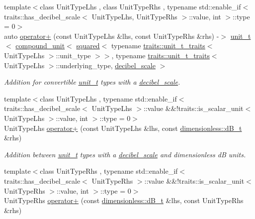 \begin{DoxyCompactItemize}
\item 
\hypertarget{namespaceunits_a488c7b98d0a88d36d584354ed7de0c09}{}{\footnotesize template$<$class Unit\+Type\+Lhs , class Unit\+Type\+Rhs , typename std\+::enable\+\_\+if$<$ traits\+::has\+\_\+decibel\+\_\+scale$<$ Unit\+Type\+Lhs, Unit\+Type\+Rhs $>$\+::value, int $>$\+::type  = 0$>$ }\\auto \hyperlink{namespaceunits_a488c7b98d0a88d36d584354ed7de0c09}{operator+} (const Unit\+Type\+Lhs \&lhs, const Unit\+Type\+Rhs \&rhs) -\/$>$ \hyperlink{classunits_1_1unit__t}{unit\+\_\+t}$<$ \hyperlink{group___unit_types_ga9c3f6f077dc894620e1ed8358442a8f1}{compound\+\_\+unit}$<$ \hyperlink{group___unit_manipulators_ga636346f7898c35eb98a796bec1d77fb2}{squared}$<$ typename \hyperlink{structunits_1_1traits_1_1unit__t__traits}{traits\+::unit\+\_\+t\+\_\+traits}$<$ Unit\+Type\+Lhs $>$\+::unit\+\_\+type $>$$>$, typename \hyperlink{structunits_1_1traits_1_1unit__t__traits}{traits\+::unit\+\_\+t\+\_\+traits}$<$ Unit\+Type\+Lhs $>$\+::underlying\+\_\+type, \hyperlink{structunits_1_1decibel__scale}{decibel\+\_\+scale} $>$\label{namespaceunits_a488c7b98d0a88d36d584354ed7de0c09}

\begin{DoxyCompactList}\small\item\em Addition for convertible \hyperlink{classunits_1_1unit__t}{unit\+\_\+t} types with a \hyperlink{structunits_1_1decibel__scale}{decibel\+\_\+scale}. \end{DoxyCompactList}\item 
\hypertarget{namespaceunits_adf06dd60e06ef1eed7a1bb57cb548ecb}{}{\footnotesize template$<$class Unit\+Type\+Lhs , typename std\+::enable\+\_\+if$<$ traits\+::has\+\_\+decibel\+\_\+scale$<$ Unit\+Type\+Lhs $>$\+::value \&\&!traits\+::is\+\_\+scalar\+\_\+unit$<$ Unit\+Type\+Lhs $>$\+::value, int $>$\+::type  = 0$>$ }\\Unit\+Type\+Lhs \hyperlink{namespaceunits_adf06dd60e06ef1eed7a1bb57cb548ecb}{operator+} (const Unit\+Type\+Lhs \&lhs, const \hyperlink{classunits_1_1unit__t}{dimensionless\+::d\+B\+\_\+t} \&rhs)\label{namespaceunits_adf06dd60e06ef1eed7a1bb57cb548ecb}

\begin{DoxyCompactList}\small\item\em Addition between \hyperlink{classunits_1_1unit__t}{unit\+\_\+t} types with a \hyperlink{structunits_1_1decibel__scale}{decibel\+\_\+scale} and dimensionless d\+B units. \end{DoxyCompactList}\item 
\hypertarget{namespaceunits_ae865c6df51af18fed561ca9b3c270202}{}{\footnotesize template$<$class Unit\+Type\+Rhs , typename std\+::enable\+\_\+if$<$ traits\+::has\+\_\+decibel\+\_\+scale$<$ Unit\+Type\+Rhs $>$\+::value \&\&!traits\+::is\+\_\+scalar\+\_\+unit$<$ Unit\+Type\+Rhs $>$\+::value, int $>$\+::type  = 0$>$ }\\Unit\+Type\+Rhs \hyperlink{namespaceunits_ae865c6df51af18fed561ca9b3c270202}{operator+} (const \hyperlink{classunits_1_1unit__t}{dimensionless\+::d\+B\+\_\+t} \&lhs, const Unit\+Type\+Rhs \&rhs)\label{namespaceunits_ae865c6df51af18fed561ca9b3c270202}


\end{DoxyCompactItemize}
